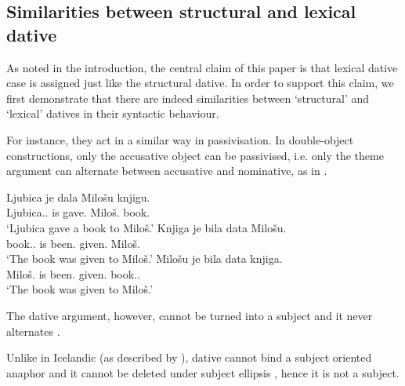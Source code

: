 \documentclass[output=paper,
modfonts,
newtxmath,
hidelinks
]{langscibook}
\begin{document}
\subsection{Similarities between structural and lexical dative}

As noted in the introduction, the central claim of this paper is that lexical dative case is assigned just like the structural dative. In order to support this claim, we first demonstrate that there are indeed similarities between `structural' and `lexical' datives in their syntactic behaviour.

For instance, they act in a similar way in passivisation. In double-object constructions, only the accusative object can be passivised, i.e. only the theme argument can alternate between accusative and nominative, as in .

\ea\label{structuraldativepassive} 
\ea \gll Ljubica je dala Milošu knjigu.\\
Ljubica.\nomm.\fsg{} is gave.\fsg{} Miloš.\datt{} book.\accc\\
\glt `Ljubica gave a book to Miloš.'
\ex \gll Knjiga je bila data Milošu.\\
book.\nomm.\fsg{} is been.\fsg{} given.\fsg{} Miloš.\datt\\
\glt `The book was given to Miloš.'
\ex \label{structuraldativepassiveb}\gll Milošu je bila data knjiga.\\
Miloš.\datt{} is been.\fsg{} given.\fsg{} book.\nomm.\fsg\\
\glt `The book was given to Miloš.'
\z \z

\noindent The dative argument, however, cannot be turned into a subject and it never alternates .

\ea\label{ex18}
\z \z

\noindent Unlike in Icelandic (as described by \citealt{zaenenetal85}), dative cannot bind a subject oriented anaphor  and it cannot be deleted under subject ellipsis , hence it is not a subject.
\end{document}
